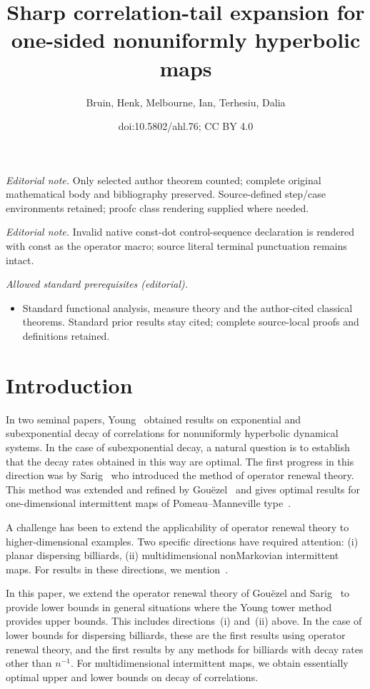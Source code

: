 \documentclass[10pt]{amsart}
\title{Sharp correlation-tail expansion for one-sided nonuniformly hyperbolic maps}
\author{Bruin, Henk, Melbourne, Ian, Terhesiu, Dalia}
\date{doi:10.5802/ahl.76; CC BY 4.0}
\theoremstyle{definition}\newtheorem{defi}[theo]{Definition}\newtheorem{rema}[theo]{Remark}\newtheorem{exam}[theo]{Example}\newtheorem{exem}[theo]{Example}\newtheorem{nota}[theo]{Notation}
\begin{document}
\maketitle
\noindent\textit{Editorial note.} Only selected author theorem counted; complete original mathematical body and bibliography preserved. Source-defined step/case environments retained; proofc class rendering supplied where needed.\par\medskip
\noindent\textit{Editorial note.} Invalid native const-dot control-sequence declaration is rendered with const as the operator macro; source literal terminal punctuation remains intact.\par\medskip
\noindent\textit{Allowed standard prerequisites (editorial).}\begin{itemize}
\item Standard functional analysis, measure theory and the author-cited classical theorems. Standard prior results stay cited; complete source-local proofs and definitions retained.
\end{itemize}\medskip


\section{Introduction}

In two seminal papers, Young~\cite{Young98,Young99} obtained results on exponential and subexponential decay of correlations for nonuniformly hyperbolic dynamical systems. In the case of subexponential decay, a natural question is to establish that the decay rates obtained in this way are optimal. The first progress in this direction was by Sarig~\cite{Sarig02} who introduced the method of operator renewal theory. This method was extended and refined by Gou\"ezel~\cite{Gouezel04a} and gives optimal results for one-dimensional intermittent maps of Pomeau--Manneville type~\cite{PomeauManneville80,Thaler80}.

A challenge has been to extend the applicability of operator renewal theory to higher-dimensional examples. Two specific directions have required attention: (i) planar dispersing billiards, (ii) multidimensional nonMarkovian intermittent maps. For results in these directions, we mention~\cite{HuVaientiapp,VaientiZhangsub}.

In this paper, we extend the operator renewal theory of Gou\"ezel and Sarig~\cite{Gouezel04a,Sarig02} to provide lower bounds in general situations where the Young tower method \cite{Young99} provides upper bounds. This includes directions~(i) and~(ii) above. In the case of lower bounds for dispersing billiards, these are the first results using operator renewal theory, and the first results by any methods for billiards with decay rates other than $n^{-1}$. For multidimensional intermittent maps, we obtain essentially optimal upper and lower bounds on decay of correlations.
\end{document}
